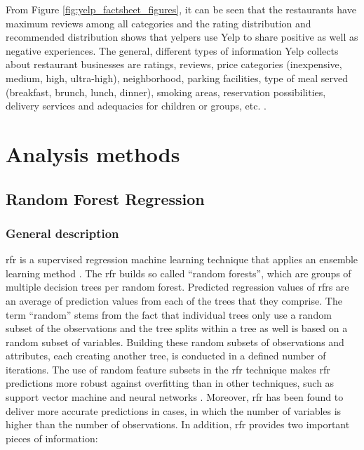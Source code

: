 \documentclass[a4paper, 11pt, oneside]{Thesis}  %
\begin{document}
From Figure \ref{fig:yelp_factsheet_figures}, it can be seen that the restaurants have maximum reviews among all categories and the rating distribution and recommended distribution shows that yelpers use Yelp to share positive as well as negative experiences. The general, different types of information Yelp collects about restaurant businesses are ratings, reviews, price categories (inexpensive, medium, high, ultra-high), neighborhood, parking facilities, type of meal served (breakfast, brunch, lunch, dinner), smoking areas, reservation possibilities, delivery services and adequacies for children or groups, etc. \cite{YelpInc..2018}.  


 
 \chapter{Analysis methods}

\section{Random Forest Regression}

\subsection{General description}

\ac{rfr} is a supervised regression machine learning technique that applies an ensemble learning method \cite{Gromping.2009}. The \ac{rfr} builds so called “random forests”, which are groups of multiple decision trees per random forest. Predicted regression values of \ac{rfr}s are an average of prediction values from each of the trees that they comprise. The term “random” stems from the fact that individual trees only use a random subset of the observations and the tree splits within a tree as well is based on a random subset of variables. Building these random subsets of observations and attributes, each creating another tree, is conducted in a defined number of iterations. The use of random feature subsets in the \ac{rfr} technique makes \ac{rfr} predictions more robust against overfitting than in other techniques, such as support vector machine and neural networks \cite{Liaw.2002}. Moreover, \ac{rfr} has been found to deliver more accurate predictions in cases, in which the number of variables is higher than the number of observations. In addition, \ac{rfr} provides two important pieces of information:
\end{document}
